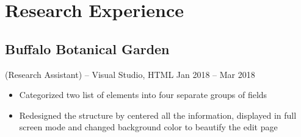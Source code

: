 \documentclass[11pt, letterpaper]{article} %
\begin{document}

\section{Research Experience}
\subsection{Buffalo Botanical Garden}
(Research Assistant) -- Visual Studio, HTML 
\hspace*{\fill}Jan 2018 -- Mar 2018
\vspace{-0.8em}
\begin{itemize}
	\setlength\itemsep{-0.5em}
	\item Categorized two list of elements into four separate groups of fields
	\item Redesigned the structure by centered all the information, displayed in full screen mode and changed background color to beautify the edit page
\end{itemize}
\end{document}
